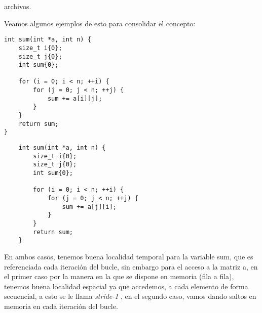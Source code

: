 archivos. 
\begin{ejemplo}
    Veamos algunos ejemplos de esto para consolidar el concepto:
    \begin{center}
        \begin{minipage}{0.4\textwidth}
            \begin{verbatim}
int sum(int *a, int n) {
    size_t i{0};
    size_t j{0};
    int sum{0};

    for (i = 0; i < n; ++i) {
        for (j = 0; j < n; ++j) {
            sum += a[i][j];
        }
    }
    return sum;
}
            \end{verbatim}
        \end{minipage}
        \begin{minipage}{0.4\textwidth}
            \begin{verbatim}
    int sum(int *a, int n) {
        size_t i{0};
        size_t j{0};
        int sum{0};

        for (i = 0; i < n; ++i) {
            for (j = 0; j < n; ++j) {
                sum += a[j][i];
            }
        }
        return sum;
    }
            \end{verbatim}
        \end{minipage}
    \end{center}
\end{ejemplo}
En ambos casos, tenemos buena localidad temporal para la variable sum, que es referenciada 
cada iteración del bucle, sin embargo para el acceso a la matriz a, en el primer caso
por la manera en la que se dispone en memoria (fila a fila), tenemos buena localidad espacial ya que accedemos, 
a cada elemento de forma secuencial, a esto se le llama \textit{stride-1}
, en el segundo caso, vamos dando saltos en memoria en cada iteración del bucle.
